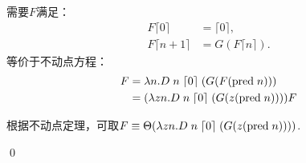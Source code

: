 \begin{pf} \rm 需要$F$满足：
$$
\begin{aligned}
    F \lceil 0 \rceil &= \lceil 0 \rceil, \\
    F \lceil n+1 \rceil &= G (F \lceil n \rceil).        
\end{aligned}
$$
等价于不动点方程：
$$
\begin{aligned}
F &= \lambda n. D\;n\;\lceil 0 \rceil\;(G (F (\mathrm{pred}\;n))) \\    
&= (\lambda z n. D\;n\;\lceil 0 \rceil\;(G (z (\mathrm{pred}\;n)))) F
\end{aligned}
$$

根据不动点定理，可取$F\equiv \Theta (\lambda z n. D\;n\;\lceil 0 \rceil\;(G (z (\mathrm{pred}\;n))))$.

    \qed 
\end{pf}